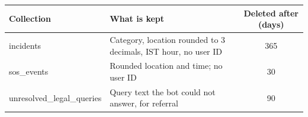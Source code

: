 \begin{tabular}{llc}
\hline
Collection & What is kept & Deleted after (days) \\
\hline
incidents & Category, location rounded to 3 decimals, IST hour, no user ID & 365 \\
sos\_events & Rounded location and time; no user ID & 30 \\
unresolved\_legal\_queries & Query text the bot could not answer, for referral & 90 \\
\hline
\end{tabular}
